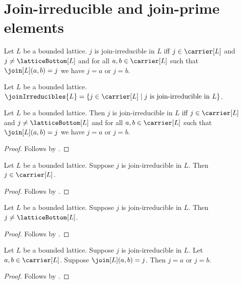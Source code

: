\section{Join-irreducible and join-prime elements}



\begin{definition}\label{join_irreducible}
    Let $L$ be a bounded lattice.
    $j$ is join-irreducible in $L$ iff
        $j\in\carrier[L]$ and
        $j\neq\latticeBottom[L]$ and
        for all $a,b\in\carrier[L]$ such that
            $\join[L](a,b)=j$ we have $j=a$ or $j=b$.
\end{definition}

\begin{definition}\label{join_irreducibles}
    Let $L$ be a bounded lattice.
    $\joinIrreducibles{L}=\{j\in\carrier[L]\mid
        \text{$j$ is join-irreducible in $L$}\}$.
\end{definition}

\begin{proposition}\label{join_irreducible_iff}
    Let $L$ be a bounded lattice.
    Then $j$ is join-irreducible in $L$ iff
        $j\in\carrier[L]$ and
        $j\neq\latticeBottom[L]$ and
        for all $a,b\in\carrier[L]$ such that
            $\join[L](a,b)=j$ we have $j=a$ or $j=b$.
\end{proposition}
\begin{proof}
    Follows by .
\end{proof}

\begin{proposition}\label{join_irreducible_type}
    Let $L$ be a bounded lattice.
    Suppose $j$ is join-irreducible in $L$.
    Then $j\in\carrier[L]$.
\end{proposition}
\begin{proof}
    Follows by .
\end{proof}

\begin{proposition}\label{join_irreducible_nonbottom}
    Let $L$ be a bounded lattice.
    Suppose $j$ is join-irreducible in $L$.
    Then $j\neq\latticeBottom[L]$.
\end{proposition}
\begin{proof}
    Follows by .
\end{proof}

\begin{proposition}\label{join_irreducible_elim}
    Let $L$ be a bounded lattice.
    Suppose $j$ is join-irreducible in $L$.
    Let $a,b\in\carrier[L]$.
    Suppose $\join[L](a,b)=j$.
    Then $j=a$ or $j=b$.
\end{proposition}
\begin{proof}
    Follows by .
\end{proof}

